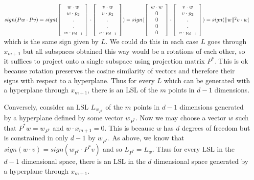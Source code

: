 \documentclass[]{article}
\begin{document}
$sign(Pw \cdot Pv) = 
sign(
\left[
\begin{array}{c}
w \cdot w \\
w \cdot p_2\\
.\\
.\\
w \cdot p_{d-1}\\
\end{array}
\right]
\cdot
\left[
\begin{array}{c}
v \cdot w \\
v \cdot p_2\\
.\\
.\\
v \cdot p_{d-1}\\
\end{array}\\
\right]
)\\
=
sign(
\left[
\begin{array}{c}
w \cdot w \\
0\\
0\\
0\\
0
\end{array}
\right]
\cdot
\left[
\begin{array}{c}
v \cdot w \\
v \cdot p_2\\
.\\
.\\
v \cdot p_{d-1}\\
\end{array}
\right])\\
= sign(||w||^2 v \cdot w)
$\\
which is the same sign given by $L$. We could do this in each case $L$ goes through $x_{m+1}$ but all subspaces obtained this way would be a rotations of each other, so it suffices to project onto a single subspace using projection matrix $P^*$. This is ok because rotation preserves the cosine similarity of vectors and therefore their signs with respect to a hyperplane. Thus for every $L$ which can be generated with a hyperplane through $x_{m+1}$, there is an LSL of the $m$ points in $d-1$ dimensions.

Conversely, consider an LSL $L_{w_{P^*}}$ of the $m$ points in $d-1$ dimensions generated by a hyperplane defined by some vector $w_{P^*}$. Now we may choose a vector $w$ such that $P^* w = w_{P^*}$ and $w \cdot x_{m+1} = 0$. This is because $w$ has $d$ degrees of freedom but is constrained in only $d-1$ by $w_{P^*}$. As above, we know that $sign(w \cdot v) = sign(w_{P^*} \cdot P^*v)$ and so $L_{P^*} = L_{w}$. Thus for every LSL in the $d-1$ dimensional space, there is an LSL in the $d$ dimensional space generated by a hyperplane through $x_{m+1}$. 
\end{document}
